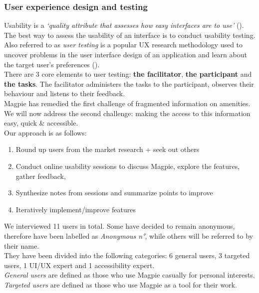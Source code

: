\subsubsection{User experience design and testing}
Usability is a \emph{`quality attribute that assesses how easy interfaces are to use'} (\cite{usabilitycomponentsnielsen}). The best way to assess the usability of an interface is to conduct usability testing.\\
Also referred to as \emph{user testing} is a popular UX research methodology used to uncover problems in the user interface design of an application and learn about the target user's preferences (\cite{usertestingdefinition}).\\

\noindent There are 3 core elements to user testing: \textbf{the facilitator}, \textbf{the participant} and \textbf{the tasks}. The facilitator administers the tasks to the participant, observes their behaviour and listens to their feedback.\\

\noindent Magpie has remedied the first challenge of fragmented information on amenities. We will now address the second challenge: making the access to this information easy, quick \& accessible.\\

\noindent Our approach is as follows:
\begin{enumerate}
    \item Round up users from the market research + seek out others
    \item Conduct online usability sessions to discuss Magpie, explore the features, gather feedback,
    \item Synthesize notes from sessions and summarize points to improve
    \item Iteratively implement/improve features
\end{enumerate}
We interviewed 11 users in total. Some have decided to remain anonymous, therefore have been labelled as \emph{Anonymous n°}, while others will be referred to by their name. \\ They have been divided into the following categories: 6 general users, 3 targeted users, 1 UI/UX expert and 1 accessibility expert.\\
\emph{General users} are defined as those who use Magpie casually for personal interests.\\ \emph{Targeted users} are defined as those who use Magpie as a tool for their work.

